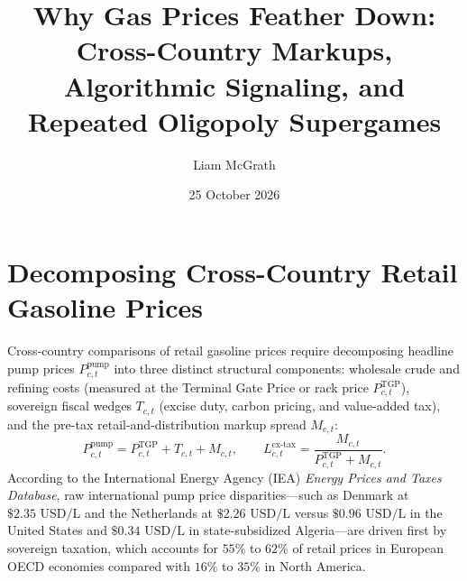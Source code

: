 \documentclass[11pt]{article}
\title{Why Gas Prices Feather Down: Cross-Country Markups, Algorithmic Signaling, and Repeated Oligopoly Supergames}
\author{Liam McGrath}
\date{25 October 2026}
\begin{document}
\maketitle
\tableofcontents

\section{Decomposing Cross-Country Retail Gasoline Prices}
\label{sec:gas-decomposition}
Cross-country comparisons of retail gasoline prices require decomposing headline pump prices $P_{c,t}^{\text{pump}}$ into three distinct structural components: wholesale crude and refining costs (measured at the Terminal Gate Price or rack price $P_{c,t}^{\text{TGP}}$), sovereign fiscal wedges $T_{c,t}$ (excise duty, carbon pricing, and value-added tax), and the pre-tax retail-and-distribution markup spread $M_{c,t}$:
\begin{equation}
P_{c,t}^{\text{pump}} = P_{c,t}^{\text{TGP}} + T_{c,t} + M_{c,t}, \qquad
L_{c,t}^{\text{ex-tax}} = \frac{M_{c,t}}{P_{c,t}^{\text{TGP}} + M_{c,t}}.
\label{eq:pump-decomposition}
\end{equation}
According to the International Energy Agency (IEA) \textit{Energy Prices and Taxes Database}, raw international pump price disparities---such as Denmark at $\$2.35\text{ USD/L}$ and the Netherlands at $\$2.26\text{ USD/L}$ versus $\$0.96\text{ USD/L}$ in the United States and $\$0.34\text{ USD/L}$ in state-subsidized Algeria---are driven first by sovereign taxation, which accounts for $55\%$ to $62\%$ of retail prices in European OECD economies compared with $16\%$ to $35\%$ in North America.
\end{document}

